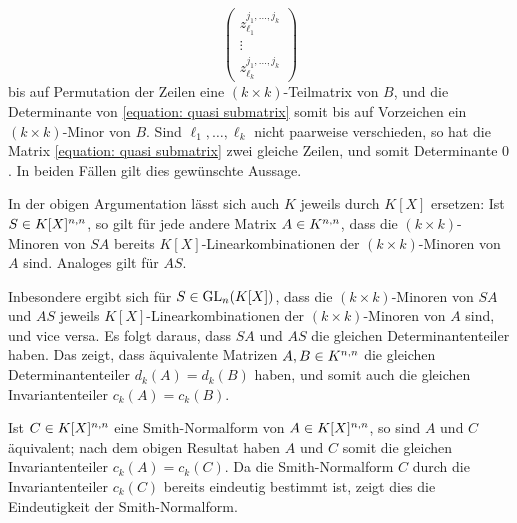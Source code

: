 \begin{equation}
  \label{equation: quasi submatrix}
  \begin{pmatrix}
    z_{\ell_1}^{j_1, \dotsc, j_k} \\
    \vdots                        \\
    z_{\ell_k}^{j_1, \dotsc, j_k}
  \end{pmatrix}
\end{equation}
bis auf Permutation der Zeilen eine $(k \times k)$-Teilmatrix von $B$, und die Determinante von \eqref{equation: quasi submatrix} somit bis auf Vorzeichen ein $(k \times k)$-Minor von $B$.
Sind $\ell_1, \dotsc, \ell_k$ nicht paarweise verschieden, so hat die Matrix \eqref{equation: quasi submatrix} zwei gleiche Zeilen, und somit Determinante $0$.
In beiden Fällen gilt dies gewünschte Aussage.

\begin{remark}
  In der obigen Argumentation lässt sich auch $K$ jeweils durch $K[X]$ ersetzen:
  Ist $S \in \matrices{n}{K[X]}$, so gilt für jede andere Matrix $A \in \matrices{n}{K}$, dass die $(k \times k)$-Minoren von $SA$ bereits $K[X]$-Linearkombinationen der $(k \times k)$-Minoren von $A$ sind.
  Analoges gilt für $AS$.
  
  Inbesondere ergibt sich für $S \in \GL{n}{K[X]}$, dass die $(k \times k)$-Minoren von $SA$ und $AS$ jeweils $K[X]$-Linearkombinationen der $(k \times k)$-Minoren von $A$ sind, und vice versa.
  Es folgt daraus, dass $SA$ und $AS$ die gleichen Determinantenteiler haben.
  Das zeigt, dass äquivalente Matrizen $A, B \in \matrices{n}{K}$ die gleichen Determinantenteiler $d_k(A) = d_k(B)$ haben, und somit auch die gleichen Invariantenteiler $c_k(A) = c_k(B)$.
  
  Ist $C \in \matrices{n}{K[X]}$ eine Smith-Normalform von $A \in \matrices{n}{K[X]}$, so sind $A$ und $C$ äquivalent;
  nach dem obigen Resultat haben $A$ und $C$ somit die gleichen Invariantenteiler $c_k(A) = c_k(C)$.
  Da die Smith-Normalform $C$ durch die Invariantenteiler $c_k(C)$ bereits eindeutig bestimmt ist, zeigt dies die Eindeutigkeit der Smith-Normalform.
\end{remark}


